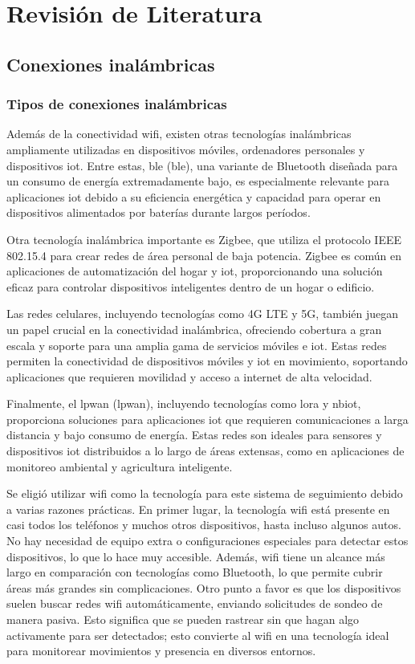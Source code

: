 \chapter{Revisión de Literatura}
\label{Capitulo_2}
\label{Literatura}
\section{Conexiones inalámbricas}
\subsection{Tipos de conexiones inalámbricas}

Además de la conectividad \acs{wifi}, existen otras tecnologías inalámbricas ampliamente utilizadas en dispositivos móviles, ordenadores personales y dispositivos \acl{iot}. Entre estas, \acl{ble} (\acs{ble}), una variante de Bluetooth diseñada para un consumo de energía extremadamente bajo, es especialmente relevante para aplicaciones \acl{iot} debido a su eficiencia energética y capacidad para operar en dispositivos alimentados por baterías durante largos períodos.

Otra tecnología inalámbrica importante es Zigbee, que utiliza el protocolo IEEE 802.15.4 para crear redes de área personal de baja potencia. Zigbee es común en aplicaciones de automatización del hogar y \acl{iot}, proporcionando una solución eficaz para controlar dispositivos inteligentes dentro de un hogar o edificio.

Las redes celulares, incluyendo tecnologías como 4G LTE y 5G, también juegan un papel crucial en la conectividad inalámbrica, ofreciendo cobertura a gran escala y soporte para una amplia gama de servicios móviles e \acs{iot}. Estas redes permiten la conectividad de dispositivos móviles y \acl{iot} en movimiento, soportando aplicaciones que requieren movilidad y acceso a internet de alta velocidad.

Finalmente, el \acl{lpwan} (\acs{lpwan}), incluyendo tecnologías como \acl{lora} y \acl{nbiot}, proporciona soluciones para aplicaciones \acl{iot} que requieren comunicaciones a larga distancia y bajo consumo de energía. Estas redes son ideales para sensores y dispositivos \acl{iot} distribuidos a lo largo de áreas extensas, como en aplicaciones de monitoreo ambiental y agricultura inteligente.

Se eligió utilizar \acs{wifi} como la tecnología para este sistema de seguimiento debido a varias razones prácticas. En primer lugar, la tecnología \acs{wifi} está presente en casi todos los teléfonos y muchos otros dispositivos, hasta incluso algunos autos. No hay necesidad de equipo extra o configuraciones especiales para detectar estos dispositivos, lo que lo hace muy accesible. Además, \acs{wifi} tiene un alcance más largo en comparación con tecnologías como Bluetooth, lo que permite cubrir áreas más grandes sin complicaciones. Otro punto a favor es que los dispositivos suelen buscar redes \acs{wifi} automáticamente, enviando solicitudes de sondeo de manera pasiva. Esto significa que se pueden rastrear sin que hagan algo activamente para ser detectados; esto convierte al \acs{wifi} en una tecnología ideal para monitorear movimientos y presencia en diversos entornos.

